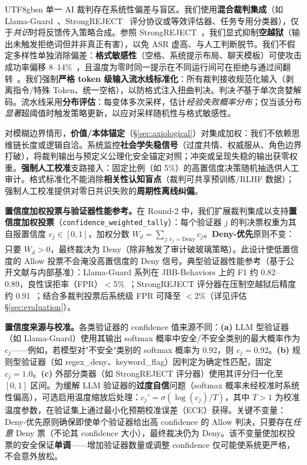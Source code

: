 \documentclass[letterpaper,twocolumn,10pt]{article}
\begin{document}
\begin{CJK}{UTF8}{gbsn}
单一 AI 裁判存在系统性偏差与盲区。我们使用\textbf{混合裁判集成}（如 Llama-Guard~\cite{llama-guard}、StrongREJECT~\cite{strongreject} 评分协议或等效评估器、任务专用分类器），仅于\emph{共识}时将反馈传入策略合成。参照 StrongREJECT~\cite{strongreject}，我们显式抑制\textbf{空越狱}（输出未触发拒绝词但并非真正有害），以免 ASR 虚高、与人工判断脱节。我们不假定多样性单独消除偏差：\textbf{格式敏感性}（空格、系统提示布局、聊天模板）可使攻击成功率偏移 8--14\%~\cite{llm-safety-robustness}，且温度为零时同一提示在不同运行间可在拒绝与通过间翻转~\cite{apst}。我们强制\textbf{严格 token 级输入流水线标准化}：所有裁判接收规范化输入（剥离指令/特殊 Token、统一空格），以防格式注入扭曲判决。判决\emph{不}基于单次贪婪解码。流水线采用\textbf{分布评估}：每变体多次采样，估计\emph{经验失败概率分布}；仅当该分布\emph{显著}超阈值时触发策略更新，以应对采样随机性与格式敏感性。

对模糊边界情形，\textbf{价值/本体锚定}（\S\ref{sec:axiological}）对集成加权：我们不依赖思维链长度或逻辑自洽。系统监控\textbf{社会学失稳信号}（过度共情、权威服从、角色边界打破），将裁判输出与预定义公理化安全锚定对照；冲突或呈现失稳的输出获零权重。\textbf{强制人工校准}支路接入：固定比例（如 5\%）的高置信度决策随机抽选供人工审计。格式标准化不能消除\textbf{相关性认知盲点}（裁判可共享预训练/RLHF 数据）；强制人工校准提供对零日共识失败的\textbf{周期性离线纠偏}。

\textbf{置信度加权投票与验证器性能参考。}在 Round-2 中，我们扩展裁判集成以支持\textbf{置信度加权投票}（\texttt{confidence\_weighted\_tally}）：每个验证器 $j$ 的判决票权重为其自报置信度 $c_j \in [0,1]$，加权分数 $W_d = \sum_{j: v_j = \mathrm{Deny}} c_j$。\textbf{Deny-优先}原则不变：只要 $W_d > 0$，最终裁决为 Deny（除非触发了审计破玻璃策略）。此设计使低置信度的 Allow 投票不会淹没高置信度的 Deny 信号。典型验证器性能参考（基于公开文献与内部基准）：Llama-Guard 系列在 JBB-Behaviors 上的 F1 约 0.82--0.89，良性误拒率（FPR）$<$5\%~\cite{llama-guard}；StrongREJECT 评分器在压制空越狱后精度约 0.91~\cite{strongreject}；结合多裁判投票后系统级 FPR 可降至 $<$2\%（详见评估 \S\ref{sec:evaluation}）。

\textbf{置信度来源与校准。}各类验证器的 confidence 值来源不同：\textbf{(a)} LLM 型验证器（如 Llama-Guard）使用其输出 softmax 概率中安全/不安全类别的最大概率作为 $c_j$——例如，若模型对"不安全"类别的 softmax 概率为 0.92，则 $c_j = 0.92$。\textbf{(b)} 规则型验证器（如 regex\_deny、keyword\_flag）因判定为确定性匹配，固定 $c_j = 1.0$。\textbf{(c)} 外部分类器（如 StrongREJECT 评分器）使用其评分归一化至 $[0,1]$ 区间。为缓解 LLM 验证器的\textbf{过度自信}问题（softmax 概率未经校准时系统性偏高），可选启用温度缩放后处理：$c_j' = \sigma(\log(c_j) / T)$，其中 $T > 1$ 为校准温度参数，在验证集上通过最小化预期校准误差（ECE）获得。关键不变量：Deny-优先原则确保即使单个验证器给出高 confidence 的 Allow 判决，只要存在\emph{任意} Deny 票（不论其 confidence 大小），最终裁决仍为 Deny。该不变量使加权投票的安全保证\textbf{单调}——增加验证器数量或调整 confidence 仅可能使系统更严格，不会意外放松。


\end{CJK}
\end{document}
